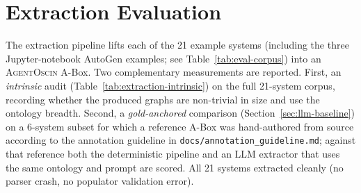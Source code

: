 \section{Extraction Evaluation}\label{sec:extraction-eval}

The extraction pipeline lifts each of the 21 example systems
(including the three Jupyter-notebook AutoGen examples; see
Table~\ref{tab:eval-corpus}) into an \textsc{AgentOscin} A-Box. Two
complementary measurements are reported. First, an \emph{intrinsic}
audit (Table~\ref{tab:extraction-intrinsic}) on the full 21-system
corpus, recording whether the produced graphs are non-trivial in size
and use the ontology breadth. Second, a \emph{gold-anchored}
comparison (Section~\ref{sec:llm-baseline}) on a 6-system subset for
which a reference A-Box was hand-authored from source according to
the annotation guideline in
\texttt{docs/annotation\_guideline.md}; against that reference both
the deterministic pipeline and an LLM extractor that uses the same
ontology and prompt are scored. All 21 systems extracted cleanly (no
parser crash, no populator validation error).

